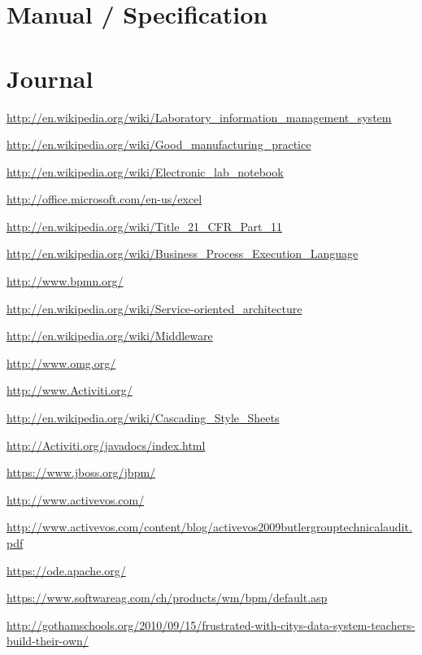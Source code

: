 \documentclass[paper=a4,twoside=false,BCOR=0mm,DIV=calc,fontsize=12pt]{scrartcl}
\begin{document}
\appendix
\section{Manual / Specification}

\section{Journal}


\begin{thebibliography}{99}

 \url{http://en.wikipedia.org/wiki/Laboratory_information_management_system}

 \url{http://en.wikipedia.org/wiki/Good_manufacturing_practice}

 \url{http://en.wikipedia.org/wiki/Electronic_lab_notebook}

 \url{http://office.microsoft.com/en-us/excel}

 \url{http://en.wikipedia.org/wiki/Title_21_CFR_Part_11}

 \url{http://en.wikipedia.org/wiki/Business_Process_Execution_Language}

 \url{http://www.bpmn.org/}

 \url{http://en.wikipedia.org/wiki/Service-oriented_architecture}

 \url{http://en.wikipedia.org/wiki/Middleware}

 \url{http://www.omg.org/}

 \url{http://www.Activiti.org/}

 \url{http://en.wikipedia.org/wiki/Cascading_Style_Sheets}

 \url{http://Activiti.org/javadocs/index.html}

 \url{https://www.jboss.org/jbpm/}

 \url{http://www.activevos.com/}

 \url{http://www.activevos.com/content/blog/activevos2009butlergrouptechnicalaudit.pdf}

 \url{https://ode.apache.org/}

 \url{https://www.softwareag.com/ch/products/wm/bpm/default.asp}

 \url{http://gothamschools.org/2010/09/15/frustrated-with-citys-data-system-teachers-build-their-own/}


\end{thebibliography}
\end{document}
